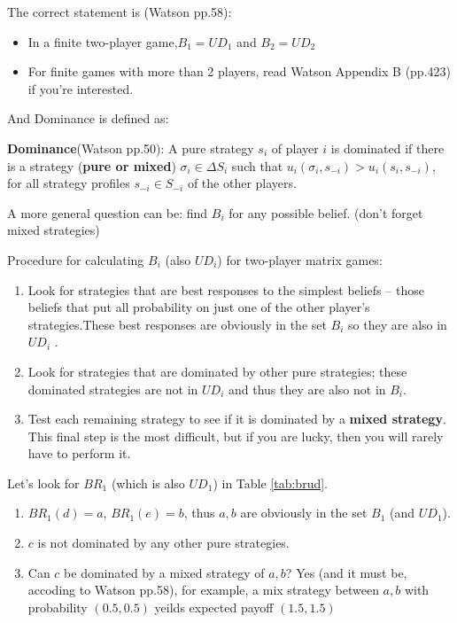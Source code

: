 \documentclass{article}
\begin{document}
\begin{mdframed}[backgroundcolor=blue!20,linecolor=white]
The correct statement is (Watson pp.58):

\begin{itemize}
\item In a finite two-player game,$B_1 = UD_1$ and $B_2 = UD_2$
\item For finite games with more than 2 players, read Watson Appendix B (pp.423) if you're interested.
\end{itemize}

And Dominance is defined as:

\textbf{Dominance}(Watson pp.50): A pure strategy $s_i$ of player $i$ is dominated if there is a strategy (\textbf{pure or mixed}) $\sigma_i \in \Delta S_i$ such that $u_i(\sigma_i , s_{−i}) > u_i (s_i , s_{−i})$, for all strategy profiles $s_{−i} \in S_{−i}$ of the other players.

\medskip

A more general question can be: find $B_i$ for any possible belief.
(don't forget mixed strategies)

\medskip

Procedure for calculating $B_i$ (also $UD_i$) for two-player matrix games:

\begin{enumerate}
\item Look for strategies that are best responses to the simplest beliefs -- those beliefs that put all probability on just one of the other player's strategies.These best responses are obviously in the set $B_i$ so they are also in $UD_i$ .
\item Look for strategies that are dominated by other pure strategies; these dominated strategies are not in $UD_i$ and thus they are also not in $B_i$.
\item Test each remaining strategy to see if it is dominated by a \textbf{mixed strategy}. This final step is the most difficult, but if you are lucky, then you will rarely have to perform it.

\end{enumerate}

Let's look for $BR_1$ (which is also $UD_1$) in Table \ref{tab:brud}.

\begin{enumerate}
\item $BR_1(d)=a$, $BR_1(e)=b$, thus ${a,b}$ are obviously in the set $B_1$ (and $UD_1$).
\item ${c}$ is not dominated by any other pure strategies.
\item Can ${c}$ be dominated by a mixed strategy of $a,b$? Yes (and it must be, accoding to Watson pp.58), for example, a mix strategy between ${a,b}$ with probability $(0.5,0.5)$ yeilds expected payoff $(1.5,1.5)$
\end{enumerate}


\end{mdframed}
\end{document}
